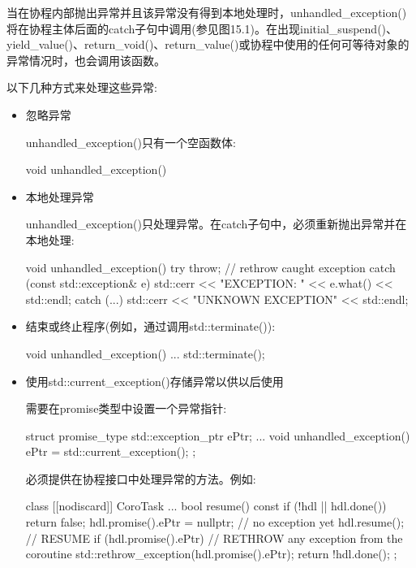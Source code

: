当在协程内部抛出异常并且该异常没有得到本地处理时，unhandled\_exception()将在协程主体后面的catch子句中调用(参见图15.1)。在出现initial\_suspend()、yield\_value()、return\_void()、return\_value()或协程中使用的任何可等待对象的异常情况时，也会调用该函数。

以下几种方式来处理这些异常:

\begin{itemize}
\item
忽略异常

unhandled\_exception()只有一个空函数体:

\begin{cpp}
void unhandled_exception() {
}
\end{cpp}

\item
本地处理异常

unhandled\_exception()只处理异常。在catch子句中，必须重新抛出异常并在本地处理:

\begin{cpp}
void unhandled_exception() {
	try {
		throw; // rethrow caught exception
	}
	catch (const std::exception& e) {
		std::cerr << "EXCEPTION: " << e.what() << std::endl;
	}
	catch (...) {
		std::cerr << "UNKNOWN EXCEPTION" << std::endl;
	}
}
\end{cpp}

\item
结束或终止程序(例如，通过调用std::terminate()):

\begin{cpp}
void unhandled_exception() {
	...
	std::terminate();
}
\end{cpp}

\item
使用std::current\_exception()存储异常以供以后使用

需要在promise类型中设置一个异常指针:

\begin{cpp}
struct promise_type {
	std::exception_ptr ePtr;
	...
	void unhandled_exception() {
		ePtr = std::current_exception();
	}
};
\end{cpp}

必须提供在协程接口中处理异常的方法。例如:

\begin{cpp}
class [[nodiscard]] CoroTask {
	...
	bool resume() const {
		if (!hdl || hdl.done()) {
			return false;
		}
		hdl.promise().ePtr = nullptr; // no exception yet
		hdl.resume(); // RESUME
		if (hdl.promise().ePtr) { // RETHROW any exception from the coroutine
			std::rethrow_exception(hdl.promise().ePtr);
		}
		return !hdl.done();
	}
};
\end{cpp}
\end{itemize}

